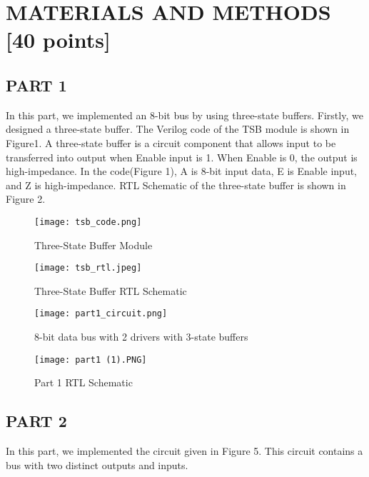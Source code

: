 \documentclass[pdftex,12pt,a4paper]{article}
\begin{document}
\section{MATERIALS AND METHODS [40 points]}



\subsection{PART 1}
In this part, we implemented an 8-bit bus by using three-state buffers. Firstly, we designed a three-state buffer. The Verilog code of the TSB module is shown in Figure1. A three-state buffer is a circuit component that allows input to be transferred into output when Enable input is 1. When Enable is 0, the output is high-impedance. In the code(Figure 1), A is 8-bit input data, E is Enable input, and Z is high-impedance. RTL Schematic of the three-state buffer is shown in Figure 2.

\begin{figure}[hbt!]
	\centering
	\texttt{[image: tsb\_code.png]}	
	\caption{Three-State Buffer Module}
	\label{fig1}
\end{figure}

\begin{figure}[hbt!]
	\centering
	\texttt{[image: tsb\_rtl.jpeg]}	
	\caption{Three-State Buffer RTL Schematic}
	\label{fig1}
\end{figure}

\clearpage

\begin{figure}[hbt!]
	\centering
	\texttt{[image: part1\_circuit.png]}	
	\caption{8-bit data bus with 2 drivers with 3-state buffers}
	\label{fig1}
\end{figure}

\begin{figure}[hbt!]
	\centering
	\texttt{[image: part1 (1).PNG]}	
	\caption{Part 1 RTL Schematic}
	\label{fig1}
\end{figure}




\clearpage

\subsection{PART 2}

In this part, we implemented the circuit given in Figure 5. This circuit contains a bus with two distinct outputs and inputs.
\end{document}
